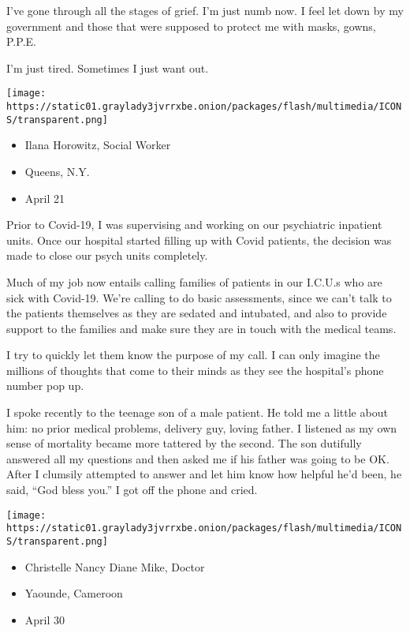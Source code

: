I've gone through all the stages of grief. I'm just numb now. I feel let
down by my government and those that were supposed to protect me with
masks, gowns, P.P.E.

I'm just tired. Sometimes I just want out.

\texttt{[image: https://static01.graylady3jvrrxbe.onion/packages/flash/multimedia/ICONS/transparent.png]}

\begin{itemize}
\tightlist
\item
  Ilana Horowitz, Social Worker
\item
  Queens, N.Y.
\item
  April 21
\end{itemize}

Prior to Covid-19, I was supervising and working on our psychiatric
inpatient units. Once our hospital started filling up with Covid
patients, the decision was made to close our psych units completely.

Much of my job now entails calling families of patients in our I.C.U.s
who are sick with Covid-19. We're calling to do basic assessments, since
we can't talk to the patients themselves as they are sedated and
intubated, and also to provide support to the families and make sure
they are in touch with the medical teams.

I try to quickly let them know the purpose of my call. I can only
imagine the millions of thoughts that come to their minds as they see
the hospital's phone number pop up.

I spoke recently to the teenage son of a male patient. He told me a
little about him: no prior medical problems, delivery guy, loving
father. I listened as my own sense of mortality became more tattered by
the second. The son dutifully answered all my questions and then asked
me if his father was going to be OK. After I clumsily attempted to
answer and let him know how helpful he'd been, he said, ``God bless
you.'' I got off the phone and cried.

\texttt{[image: https://static01.graylady3jvrrxbe.onion/packages/flash/multimedia/ICONS/transparent.png]}

\begin{itemize}
\tightlist
\item
  Christelle Nancy Diane Mike, Doctor
\item
  Yaounde, Cameroon
\item
  April 30
\end{itemize}

